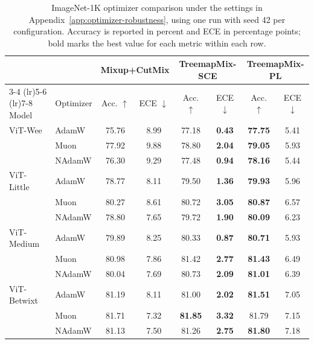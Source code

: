 \begin{table}[t]
  \centering
\caption{ImageNet-1K optimizer comparison under the settings in Appendix~\ref{app:optimizer-robustness}, using one run with seed 42 per configuration. Accuracy is reported in percent and ECE in percentage
points; bold marks the best value for each metric within each row.}
  \label{tab:in1k-optimizer-results}
  \begin{tabular}{llcccccc}
    \toprule
    & & \multicolumn{2}{c}{Mixup+CutMix}
      & \multicolumn{2}{c}{TreemapMix-SCE}
      & \multicolumn{2}{c}{TreemapMix-PL} \\
    \cmidrule(lr){3-4} \cmidrule(lr){5-6} \cmidrule(lr){7-8}
    Model & Optimizer
      & Acc. $\uparrow$ & ECE $\downarrow$
      & Acc. $\uparrow$ & ECE $\downarrow$
      & Acc. $\uparrow$ & ECE $\downarrow$ \\
    \midrule
    ViT-Wee
      & AdamW  & 75.76 & 8.99 & 77.18 & \textbf{0.43} & \textbf{77.75} & 5.41 \\
      & Muon   & 77.92 & 9.88 & 78.80 & \textbf{2.04} & \textbf{79.05} & 5.93 \\
      & NAdamW & 76.30 & 9.29 & 77.48 & \textbf{0.94} & \textbf{78.16} & 5.44 \\
    \midrule
    ViT-Little
      & AdamW  & 78.77 & 8.11 & 79.50 & \textbf{1.36} & \textbf{79.93} & 5.96 \\
      & Muon   & 80.27 & 8.61 & 80.72 & \textbf{3.05} & \textbf{80.87} & 6.57 \\
      & NAdamW & 78.80 & 7.65 & 79.72 & \textbf{1.90} & \textbf{80.09} & 6.23 \\
    \midrule
    ViT-Medium
      & AdamW  & 79.89 & 8.25 & 80.33 & \textbf{0.87} & \textbf{80.71} & 5.93 \\
      & Muon   & 80.98 & 7.86 & 81.42 & \textbf{2.77} & \textbf{81.43} & 6.49 \\
      & NAdamW & 80.04 & 7.69 & 80.73 & \textbf{2.09} & \textbf{81.01} & 6.39 \\
    \midrule
    ViT-Betwixt
      & AdamW  & 81.19 & 8.11 & 81.00 & \textbf{2.02} & \textbf{81.51} & 7.05 \\
      & Muon   & 81.71 & 7.32 & \textbf{81.85} & \textbf{3.32} & 81.79 & 7.15 \\
      & NAdamW & 81.13 & 7.50 & 81.26 & \textbf{2.75} & \textbf{81.80} & 7.18 \\
    \bottomrule
  \end{tabular}
\end{table}